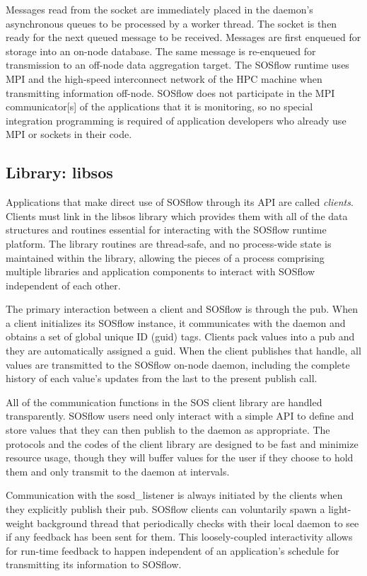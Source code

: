 %
Messages read from the socket are immediately placed in the daemon's
asynchronous queues to be processed by a worker thread.
%
The socket is then ready for the next queued message to
be received.
%
Messages are first enqueued for storage into an on-node database.
%
The same message is re-enqueued for transmission to an off-node data
aggregation target.
%
The SOSflow runtime uses MPI and the high-speed interconnect network
of the HPC machine when transmitting information off-node.
%
SOSflow does not participate in the MPI communicator[s] of the
applications that it is monitoring, so no special integration
programming is required of application developers who already use MPI
or sockets in their code.
%
\par
%
%
\subsection{Library: libsos} %
%
Applications that make direct use of SOSflow through its API are called
\textit{clients}.
%
Clients must link in the libsos library which provides them with all of
the data structures and routines essential for interacting with
the SOSflow runtime platform.
%
The library routines are thread-safe, and no process-wide state is
maintained within the library, allowing the pieces of a process
comprising multiple libraries and application components to interact with
SOSflow independent of each other.
%
\par
The primary interaction between a client and SOSflow is through the pub.
%
When a client initializes its SOSflow instance, it communicates with the
daemon and obtains a set of global unique ID (guid) tags.
%
Clients pack values into a pub and they are automatically assigned a guid.
%
When the client publishes that handle, all values are transmitted to
the SOSflow on-node daemon, including the complete history of each
value's updates from the last to the present publish call.
%
\par
%
All of the communication functions in the SOS client library are
handled transparently.
SOSflow users need only interact with a simple API
to define and store values that they can then publish to the daemon
as appropriate.
%
The protocols and the codes of the client library are designed to be
fast and minimize resource usage, though they will buffer values for
the user if they choose to hold them and only transmit to the daemon
at intervals.
%
\par
%
Communication with the sosd\_listener is always initiated by the
clients when they explicitly publish their pub.
%
SOSflow clients can voluntarily spawn a light-weight background thread
that periodically checks with their local daemon to see if any
feedback has been sent for them.
%
This loosely-coupled interactivity allows for run-time feedback to
happen independent of an application's schedule for transmitting its
information to SOSflow.
%
%

